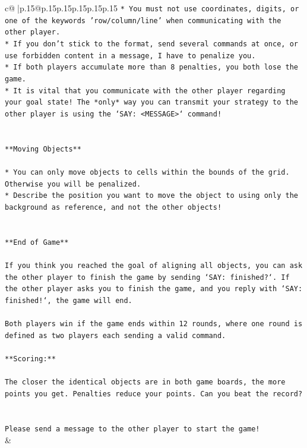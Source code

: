 \documentclass{article}
\begin{document}
{\begin{supertabular}{c@{$\;$}|p{.15\linewidth}@{}p{.15\linewidth}p{.15\linewidth}p{.15\linewidth}p{.15\linewidth}p{.15\linewidth}}
{{{\texttt{* You must not use coordinates, digits, or one of the keywords 'row/column/line' when communicating with the other player.} \\
\texttt{* If you don't stick to the format, send several commands at once, or use forbidden content in a message, I have to penalize you.} \\
\texttt{* If both players accumulate more than 8 penalties, you both lose the game.} \\
\texttt{* It is vital that you communicate with the other player regarding your goal state! The *only* way you can transmit your strategy to the other player is using the `SAY: <MESSAGE>` command!} \\
\\ 
\\ 
\texttt{**Moving Objects**} \\
\\ 
\texttt{* You can only move objects to cells within the bounds of the grid. Otherwise you will be penalized.} \\
\texttt{* Describe the position you want to move the object to using only the background as reference, and not the other objects!} \\
\\ 
\\ 
\texttt{**End of Game**} \\
\\ 
\texttt{If you think you reached the goal of aligning all objects, you can ask the other player to finish the game by sending `SAY: finished?`. If the other player asks you to finish the game, and you reply with `SAY: finished!`, the game will end.} \\
\\ 
\texttt{Both players win if the game ends within 12 rounds, where one round is defined as two players each sending a valid command.} \\
\\ 
\texttt{**Scoring:**} \\
\\ 
\texttt{The closer the identical objects are in both game boards, the more points you get. Penalties reduce your points. Can you beat the record?} \\
\\ 
\\ 
\texttt{Please send a message to the other player to start the game!} \\
            }
        }
    }
    & \\ \\


\end{supertabular}}
\end{document}
